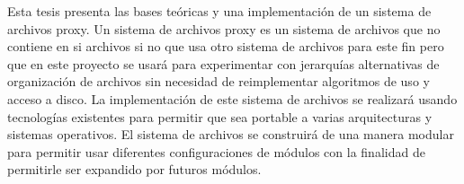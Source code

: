 


\begin{summary}        %

Esta tesis presenta las bases teóricas y una implementación de un sistema de archivos proxy. Un sistema de archivos proxy es un sistema de archivos que no contiene en si archivos si no que usa otro sistema de archivos para este fin pero que en este proyecto se usará para experimentar con jerarquías alternativas de organización de archivos sin necesidad de reimplementar algoritmos de uso y acceso a disco. La implementación de este sistema de archivos se realizará usando tecnologías existentes para permitir que sea portable a varias arquitecturas y sistemas operativos. El sistema de archivos se construirá de una manera modular para permitir usar diferentes configuraciones de módulos con la finalidad de permitirle ser expandido por futuros módulos.


\end{summary}




